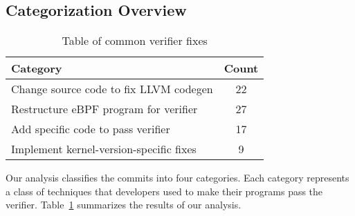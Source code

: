 \subsection{Categorization Overview}

\begin{table}[t]
    \small
    \centering
    \begin{tabular}{lc}%
        \toprule
        \textbf{Category} & \textbf{Count} \\
        \midrule
        Change source code to fix LLVM codegen & 22 \\          %
        Restructure eBPF program for verifier & 27 \\           %
        Add specific code to pass verifier & 17 \\              %
        Implement kernel-version-specific fixes & 9 \\          %
        \bottomrule
    \end{tabular}
    \caption{Table of common verifier fixes} %
    \label{fig:commit-table}
\end{table}

Our analysis classifies the commits into four categories.
Each category represents a class of techniques that developers used to make their programs pass the verifier.
Table~\ref{fig:commit-table} summarizes the results of our analysis.

